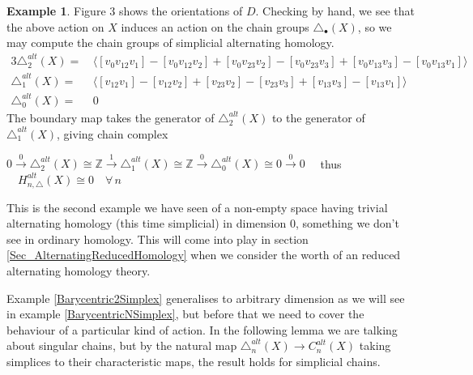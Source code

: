 \documentclass[11pt,a4paper,twoside]{article}
\theoremstyle{plain}
\theoremstyle{definition}
\theoremstyle{definition}
\theoremstyle{definition}
\theoremstyle{definition}
\newtheorem{example}[thm]{Example}
\theoremstyle{definition}
\begin{document}
\begin{example}
Figure 3 shows the orientations of $D$. Checking by hand, we see that the above action on $X$ induces an action on the chain groups $\triangle_\bullet(X)$, so we may compute the chain groups of simplicial alternating homology.
\begin{alignat*}{3}
\triangle_2^{alt}(X)= & \, \langle [v_0v_{12}v_1]-[v_0v_{12}v_2]+[v_0v_{23}v_2]-[v_0v_{23}v_3]+[v_0v_{13}v_3]-[v_0v_{13}v_1] \rangle\\
\triangle_1^{alt}(X)= & \, \langle  [v_{12}v_1]-[v_{12}v_2]+[v_{23}v_2]-[v_{23}v_3]+[v_{13}v_3]-[v_{13}v_1]\rangle\\
\triangle_0^{alt}(X)= & \, 0
\end{alignat*}The boundary map takes the generator of $\triangle_2^{alt}(X)$ to the generator of $\triangle_1^{alt}(X)$, giving chain complex
\begin{center}
$0\overset{0}{\longrightarrow}\triangle_2^{alt}(X)\cong\mathbb{Z}\overset{1}{\longrightarrow}\triangle_1^{alt}(X)\cong\mathbb{Z}\overset{0}{\longrightarrow}\triangle_0^{alt}(X)\cong0\overset{0}{\longrightarrow}0\quad$ thus $\quad H_{n,\triangle}^{alt}(X)\cong0 \quad\forall\,n$
\end{center}
This is the second example we have seen of a non-empty space having trivial alternating homology (this time simplicial) in dimension $0$, something we don't see in ordinary homology. This will come into play in section \ref{Sec_AlternatingReducedHomology} when we consider the worth of an reduced alternating homology theory.
\end{example}

Example \ref{Barycentric2Simplex} generalises to arbitrary dimension as we will see in example \ref{BarycentricNSimplex}, but before that we need to cover the behaviour of a particular kind of action. In the following lemma we are talking about singular chains, but by the natural map $\triangle_n^{alt}(X)\rightarrow C_n^{alt}(X)$ taking simplices to their characteristic maps, the result holds for simplicial chains.
\end{document}
